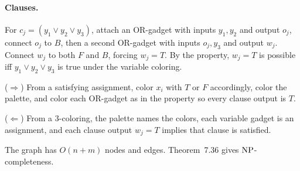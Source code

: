 \begin{soln}
\paragraph{Clauses.}
For $c_j=(y_1\lor y_2\lor y_3)$, attach an OR-gadget with inputs $y_1,y_2$ and output $o_j$, connect $o_j$ to $B$, then a second OR-gadget with inputs $o_j,y_3$ and output $w_j$. Connect $w_j$ to both $F$ and $B$, forcing $w_j=T$. By the property, $w_j=T$ is possible iff $y_1\lor y_2\lor y_3$ is true under the variable coloring.

($\Rightarrow$) From a satisfying assignment, color $x_i$ with $T$ or $F$ accordingly, color the palette, and color each OR-gadget as in the property so every clause output is $T$.

($\Leftarrow$) From a $3$-coloring, the palette names the colors, each variable gadget is an assignment, and each clause output $w_j=T$ implies that clause is satisfied.

The graph has $O(n+m)$ nodes and edges. Theorem~7.36 gives $\mathrm{NP}$-completeness.
\end{soln}

